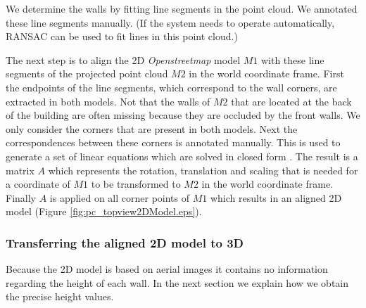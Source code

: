 We determine the walls by fitting line segments in the point cloud.  We
annotated these line segments manually.  (If the system needs to operate
automatically, RANSAC can be used to fit lines in this point cloud.)

\clearpage

The next step is to align the 2D \emph{Openstreetmap\cite{Openstreetmap}} model $M1$ with these line segments of the
projected point cloud $M2$ in the world coordinate frame.  First the endpoints of the line segments, which
correspond to the wall corners, are extracted in both models.
Not that the walls of $M2$ that are located at the back of the building are often missing
because they are occluded by the front walls. We only consider the corners that
are present in both models.
Next the correspondences between these corners is annotated manually. 
This is used to generate a set of linear equations
which are solved in closed form \cite{hartley}. The result is a matrix $A$
which represents the rotation, translation and scaling that is needed for a
coordinate of $M1$ to be transformed to $M2$ in the world coordinate frame.
Finally $A$ is applied on all corner points of $M1$ which results in an aligned 2D
model (Figure \ref{fig:pc_topview2DModel.eps}).








\subsubsection{Transferring the aligned 2D model to 3D}
Because the 2D model is based on aerial images it contains no
information regarding the height of each wall. 
In the next section we explain how we obtain the precise height values.\\

